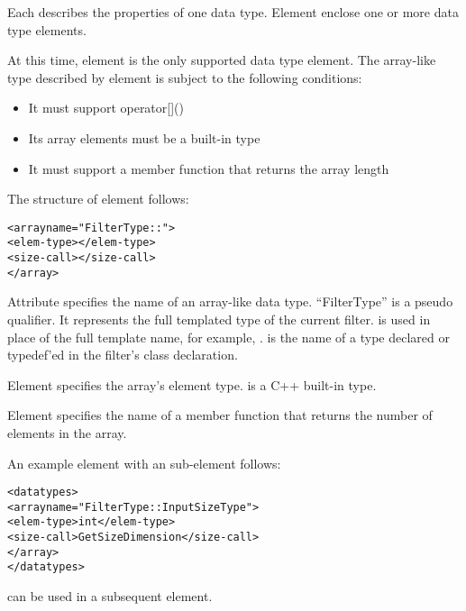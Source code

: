 Each 
describes the properties of one data type.  Element
 enclose one or more data type elements.

At this time, element  is the only supported data
type element.  The array-like type described by element
 is subject to the following conditions:

\begin{itemize}
\item It must support operator[]()
\item Its array elements must be a built-in type
\item It must support a member function that returns the array length
\end{itemize}

The structure of element  follows:

\begin{alltt}
  <array name="FilterType::">
    <elem-type></elem-type>
    <size-call></size-call>
  </array>
\end{alltt}

Attribute  specifies the name of an array-like
data type.  ``FilterType'' is a pseudo qualifier.  It represents the
full templated type of the current filter.   is
used in place of the full template name, for example, 
.
 is the name of a type declared or
typedef'ed in the filter's class declaration.

Element  specifies the array's element type.
 is a C++ built-in type.

Element  specifies the name of a member
function that returns the number of elements in the array.

An example  element with an 
sub-element follows:

\begin{alltt}
  <datatypes>
    <array name="FilterType::InputSizeType">
      <elem-type>int</elem-type>
      <size-call>GetSizeDimension</size-call>
    </array>
  </datatypes>
\end{alltt}

 can be used in a subsequent
 element.


